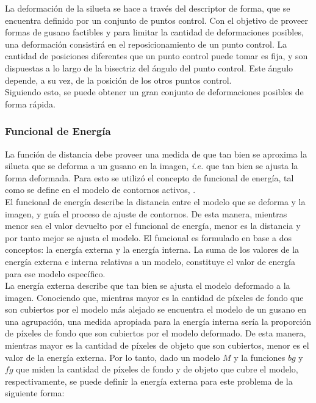 La deformaci\'on de la silueta se hace a trav\'es del descriptor de forma, que se 
encuentra definido por un conjunto de puntos control. Con el objetivo de proveer
formas de gusano factibles y para limitar la cantidad de deformaciones posibles,
una deformaci\'on consistir\'a en el reposicionamiento de un punto control.
La cantidad de posiciones diferentes que un punto control puede tomar es fija,
y son dispuestas a lo largo de la bisectriz del \'angulo del punto control. 
Este \'angulo depende, a su vez, de la posici\'on de los otros puntos control.\\
Siguiendo esto, se puede obtener un gran conjunto de deformaciones posibles
de forma r\'apida.

\subsubsection*{Funcional de Energ\'ia}
\label{sec:energyformulation} 

La funci\'on de distancia debe proveer una medida de que tan bien se aproxima la silueta que se
deforma a un gusano en la imagen, \emph{i.e.} que tan bien se ajusta la forma deformada.
Para esto se utiliz\'o el concepto de funcional de energ\'ia, tal como se define
en el modelo de contornos activos, \cite{snakes}.\\

El funcional de energ\'ia describe la distancia entre el modelo que se deforma 
y la imagen, y gu\'ia el proceso de ajuste de contornos. De esta manera, mientras menor
sea el valor devuelto por el funcional de energ\'ia, menor es la distancia y por tanto
mejor se ajusta el modelo. El funcional es formulado en base a dos 
conceptos: la energ\'ia externa y la energ\'ia interna. La suma de los valores
de la energ\'ia externa e interna relativas a un modelo, constituye el valor
de energ\'ia para ese modelo espec\'ifico.\\

La energ\'ia externa describe que tan bien se ajusta el modelo deformado a la 
imagen. Conociendo que, mientras mayor es la cantidad de p\'ixeles de fondo que son cubiertos 
por el modelo m\'as alejado se encuentra el modelo de un gusano en una agrupaci\'on, 
una medida apropiada para la energ\'ia interna ser\'ia 
la proporci\'on de p\'ixeles de fondo que son cubiertos por el modelo deformado.
De esta manera, mientras mayor es la cantidad de p\'ixeles de objeto 
que son cubiertos, menor es el valor de la energ\'ia externa.
Por lo tanto, dado un modelo $M$ y la funciones $bg$ y $fg$ que miden la cantidad
de p\'ixeles de fondo y de objeto que cubre el modelo, respectivamente, se puede
definir la energ\'ia externa para este problema de la siguiente forma:

